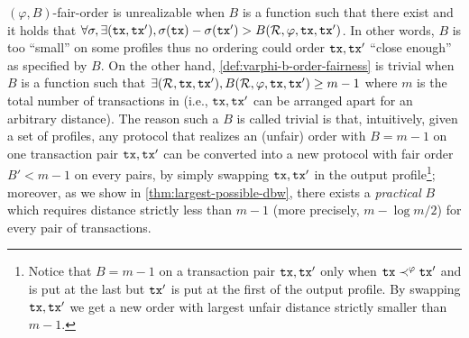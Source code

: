 $(\varphi, B)$-fair-order is unrealizable when $B$ is a function such that there exist \profileSet and it holds that $\forall \sigma, \exists (\mathtt{tx}, \mathtt{tx}'), \sigma(\mathtt{tx}) - \sigma(\mathtt{tx}') > B(\mathcal{R}, \varphi, \mathtt{tx}, \mathtt{tx}')$.
%
In other words, $B$ is too ``small'' on some profiles thus no ordering could order $\mathtt{tx}, \mathtt{tx}'$ ``close enough'' as specified by $B$.
%
On the other hand, \cref{def:varphi-b-order-fairness} is trivial when $B$ is a function such that $\exists (\mathcal{R}, \mathtt{tx}, \mathtt{tx}'),  B(\mathcal{R}, \varphi, \mathtt{tx}, \mathtt{tx}') \ge m - 1$ where $m$ is the total number of transactions in \profileSet (i.e., $\mathtt{tx}, \mathtt{tx}'$ can be arranged apart for an arbitrary distance).
% 
The reason such a $B$ is called trivial is that, intuitively, given a set of profiles, any protocol that realizes an (unfair) order with $B = m - 1$ on one transaction pair $\mathtt{tx}, \mathtt{tx}'$ can be converted into a new protocol with fair order $B' < m - 1$ on every pairs, by simply swapping $\mathtt{tx}, \mathtt{tx}'$ in the output profile\footnote{Notice that $B = m - 1$ on a transaction pair $\mathtt{tx}, \mathtt{tx}'$ only when $\mathtt{tx} \prec^\varphi \mathtt{tx}'$ and \tx is put at the last but $\mathtt{tx}'$ is put at the first of the output profile. By swapping $\mathtt{tx}, \mathtt{tx}'$ we get a new order with largest unfair distance strictly smaller than $m - 1$.};
%
moreover, as we show in \cref{thm:largest-possible-dbw}, there exists a \emph{practical} $B$ which requires distance strictly less than $m - 1$ (more precisely, $m - \log m / 2$) for every pair of transactions.

